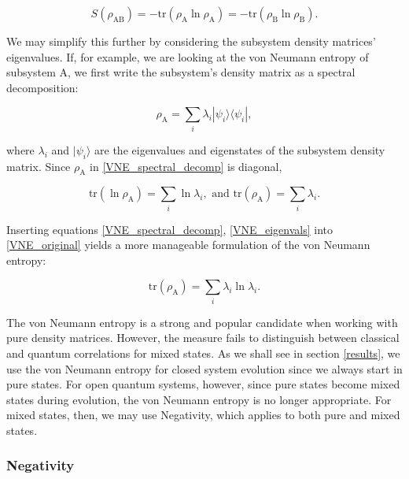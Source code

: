 \documentclass[12pt]{article}
\begin{document}
\begin{equation} \label{VNE_original}
    S(\rho_{\scriptscriptstyle \text{AB}}) = -\text{tr}(\rho_{\scriptscriptstyle \text{A}}\ln\rho_{\scriptscriptstyle \text{A}}) = -\text{tr}(\rho_{\scriptscriptstyle \text{B}}\ln\rho_{\scriptscriptstyle \text{B}}).
\end{equation}

We may simplify this further by considering the subsystem density matrices' eigenvalues. If, for example, we are looking at the von Neumann entropy of subsystem A, we first write the subsystem's density matrix as a spectral decomposition:

\begin{equation} \label{VNE_spectral_decomp}
    \rho_{\scriptscriptstyle \text{A}} = \sum_i \lambda_i|\psi_i\rangle\langle\psi_i|, 
\end{equation}

where $\lambda_i$ and $|\psi_i\rangle$ are the eigenvalues and eigenstates of the subsystem density matrix. Since $\rho_{\scriptscriptstyle \text{A}}$ in \eqref{VNE_spectral_decomp} is diagonal,

\begin{equation} \label{VNE_eigenvals}
\text{tr}(\ln\rho_{\scriptscriptstyle \text{A}}) = \sum_i \ln\lambda_i,\text{ and } \text{tr}(\rho_{\scriptscriptstyle \text{A}}) = \sum_i \lambda_i.
\end{equation}

Inserting equations \eqref{VNE_spectral_decomp}, \eqref{VNE_eigenvals} into \eqref{VNE_original} yields a more manageable formulation of the von Neumann entropy:

\begin{equation}
    \text{tr}(\rho_{\scriptscriptstyle \text{A}}) = \sum_i \lambda_i\ln\lambda_i.
\end{equation}

The von Neumann entropy is a strong and popular candidate when working with pure density matrices. However, the measure fails to distinguish between classical and quantum correlations for mixed states. As we shall see in section \ref{results}, we use the von Neumann entropy for closed system evolution since we always start in pure states. For open quantum systems, however, since pure states become mixed states during evolution, the von Neumann entropy is no longer appropriate. For mixed states, then, we may use Negativity, which applies to both pure and mixed states. 

\subsubsection{Negativity}
\end{document}
